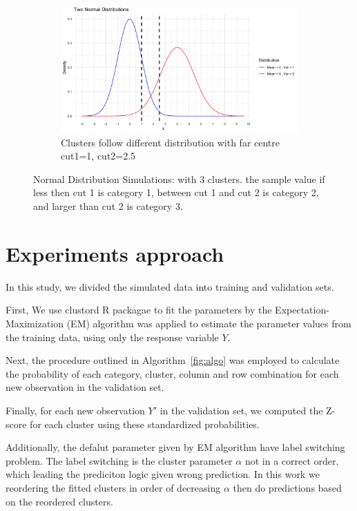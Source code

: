 \documentclass{article}
\begin{document}
\begin{figure}[htbp!]
\begin{subfigure}{0.32\textwidth}
      \centering
      \includegraphics[width=\textwidth]{images/dist_simu/nor_far.png} %
      \caption{Clusters follow different distribution with far centre\\ cut1=1, cut2=2.5}
  \end{subfigure}
  
  \caption{Normal Distribution Simulations: with 3 clusters. the sample value if less then cut 1 is category 1, between cut 1 and cut 2 is category 2, and larger than cut 2 is category 3.}
  \label{fig:dist_sim}
\end{figure}


\section{Experiments approach}

In this study, we divided the simulated data into training and validation sets.

First, We use clustord R packagae \cite{clustord2024} to fit the parameters by the Expectation-Maximization (EM) algorithm was applied to estimate the parameter values from the training data, using only the response variable $Y$.

Next, the procedure outlined in Algorithm~\ref{fig:algo} was employed to calculate the probability of each category, cluster, column and row combination for each new observation in the validation set.

Finally, for each new observation $Y'$ in the validation set, we computed the Z-score for each cluster using these standardized probabilities.

Additionally, the defalut parameter given by EM algorithm have label switching problem.
The label switching is the cluster parameter $\alpha$ not in a correct order, which leading the prediciton logic given wrong prediction.
In this work we reordering the fitted clusters in order of decreasing $\alpha$ then do predictions based on the reordered clusters.
\end{document}
